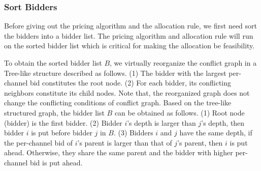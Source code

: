 \documentclass{sig-alternate}
\begin{document}
\subsubsection{Sort Bidders}

Before giving out the pricing algorithm and the allocation rule, we first need sort the bidders into a bidder list. The pricing algorithm and allocation rule will run on the sorted bidder list which is critical for making the allocation be feasibility.


To obtain the sorted bidder list $B$, we virtually reorganize the conflict graph in a Tree-like structure described as follows. (1) The bidder with the largest per-channel bid constitutes the root node. (2) For each bidder, its conflicting neighbors constitute its child nodes. Note that, the reorganized graph does not change the conflicting conditions of conflict graph. Based on the tree-like structured graph, the bidder list $B$ can be obtained as follows. (1) Root node (bidder) is the first bidder. (2) Bidder $i$'s depth is larger than $j$'s depth, then bidder $i$ is put before bidder $j$ in $B$. (3) Bidders $i$ and $j$ have the same depth, if the per-channel bid of $i$'s parent is larger than that of $j$'s parent, then $i$ is put ahead. Otherwise, they share the same parent and the bidder with higher per-channel bid is put ahead.


\end{document}
